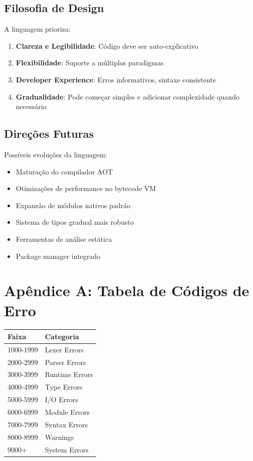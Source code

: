 \documentclass[12pt,a4paper]{article}
\theoremstyle{definition}
\begin{document}
\subsection{Filosofia de Design}

A linguagem prioriza:
\begin{enumerate}
    \item \textbf{Clareza e Legibilidade}: Código deve ser auto-explicativo
    \item \textbf{Flexibilidade}: Suporte a múltiplos paradigmas
    \item \textbf{Developer Experience}: Erros informativos, sintaxe consistente
    \item \textbf{Gradualidade}: Pode começar simples e adicionar complexidade quando necessário
\end{enumerate}

\subsection{Direções Futuras}

Possíveis evoluções da linguagem:
\begin{itemize}
    \item Maturação do compilador AOT
    \item Otimizações de performance no bytecode VM
    \item Expansão de módulos nativos padrão
    \item Sistema de tipos gradual mais robusto
    \item Ferramentas de análise estática
    \item Package manager integrado
\end{itemize}

\section*{Apêndice A: Tabela de Códigos de Erro}

\begin{center}
\begin{tabular}{|l|l|}
\hline
\textbf{Faixa} & \textbf{Categoria} \\
\hline
1000-1999 & Lexer Errors \\
2000-2999 & Parser Errors \\
3000-3999 & Runtime Errors \\
4000-4999 & Type Errors \\
5000-5999 & I/O Errors \\
6000-6999 & Module Errors \\
7000-7999 & Syntax Errors \\
8000-8999 & Warnings \\
9000+ & System Errors \\
\hline
\end{tabular}
\end{center}
\end{document}
